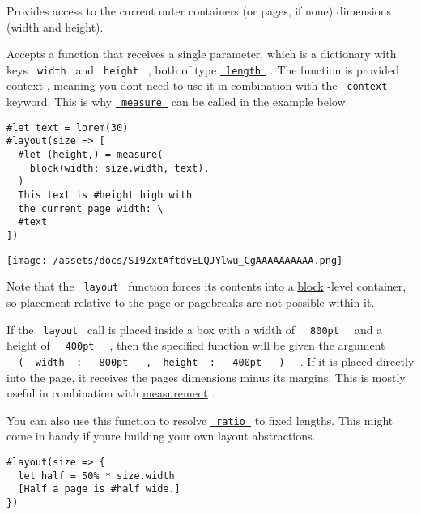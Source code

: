 Provides access to the current outer container\textquotesingle s (or
page\textquotesingle s, if none) dimensions (width and height).

Accepts a function that receives a single parameter, which is a
dictionary with keys \texttt{\ width\ } and \texttt{\ height\ } , both
of type \href{/docs/reference/layout/length/}{\texttt{\ length\ }} . The
function is provided \href{/docs/reference/context/}{context} , meaning
you don\textquotesingle t need to use it in combination with the
\texttt{\ context\ } keyword. This is why
\href{/docs/reference/layout/measure/}{\texttt{\ measure\ }} can be
called in the example below.

\begin{verbatim}
#let text = lorem(30)
#layout(size => [
  #let (height,) = measure(
    block(width: size.width, text),
  )
  This text is #height high with
  the current page width: \
  #text
])
\end{verbatim}

\texttt{[image: /assets/docs/SI9ZxtAftdvELQJYlwu\_CgAAAAAAAAAA.png]}

Note that the \texttt{\ layout\ } function forces its contents into a
\href{/docs/reference/layout/block/}{block} -level container, so
placement relative to the page or pagebreaks are not possible within it.

If the \texttt{\ layout\ } call is placed inside a box with a width of
\texttt{\ }{\texttt{\ 800pt\ }}\texttt{\ } and a height of
\texttt{\ }{\texttt{\ 400pt\ }}\texttt{\ } , then the specified function
will be given the argument
\texttt{\ }{\texttt{\ (\ }}\texttt{\ width\ }{\texttt{\ :\ }}\texttt{\ }{\texttt{\ 800pt\ }}\texttt{\ }{\texttt{\ ,\ }}\texttt{\ height\ }{\texttt{\ :\ }}\texttt{\ }{\texttt{\ 400pt\ }}\texttt{\ }{\texttt{\ )\ }}\texttt{\ }
. If it is placed directly into the page, it receives the
page\textquotesingle s dimensions minus its margins. This is mostly
useful in combination with
\href{/docs/reference/layout/measure/}{measurement} .

You can also use this function to resolve
\href{/docs/reference/layout/ratio/}{\texttt{\ ratio\ }} to fixed
lengths. This might come in handy if you\textquotesingle re building
your own layout abstractions.

\begin{verbatim}
#layout(size => {
  let half = 50% * size.width
  [Half a page is #half wide.]
})
\end{verbatim}

